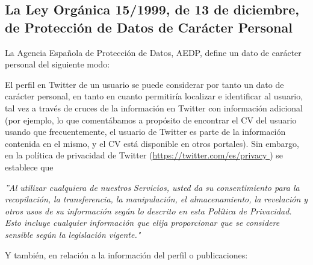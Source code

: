 \subsection{La Ley Orgánica 15/1999, de 13 de diciembre, de Protección de Datos
de Carácter Personal}
\label{subsection:LOPD}

La Agencia Española de Protección de Datos, AEDP, define un dato de carácter personal del siguiente modo:


El perfil en Twitter de un usuario se puede considerar por tanto un dato de carácter personal, en tanto en cuanto
permitiría localizar e identificar al usuario, tal vez a través de cruces de la información en Twitter con
información adicional (por ejemplo, lo que comentábamos a propósito de encontrar el CV del usuario usando que
frecuentemente, el usuario de Twitter es parte de la información contenida en el mismo, y el CV está disponible en otros 
portales). Sin embargo, en la política de privacidad de Twitter (\url{https://twitter.com/es/privacy })
se establece que
\begin{center}
\noindent\begin{minipage}{0.9\linewidth}%
\centering%
{\em ''Al utilizar cualquiera de nuestros Servicios, usted da su consentimiento para la recopilación, 
 la transferencia, la manipulación, el almacenamiento, la revelación y otros usos de su información 
 según lo descrito en esta Política de Privacidad. Esto incluye cualquier información que elija proporcionar que 
 se considere sensible según la legislación vigente."}
\end{minipage}
\end{center}
Y también, en relación a la información del perfil o publicaciones:
